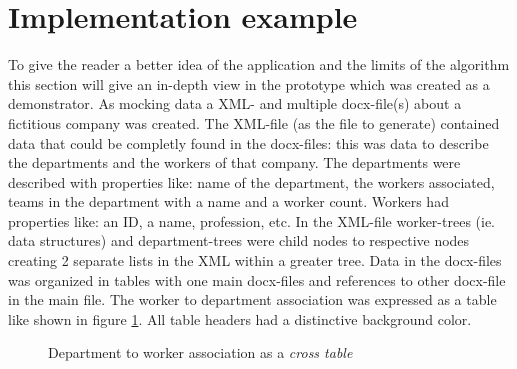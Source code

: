 \documentclass[conference]{IEEEtran}
\begin{document}
\section{Implementation example}
To give the reader a better idea of the application and the limits of the algorithm this section
will give an in-depth view in the prototype which was created as a demonstrator. As mocking
data a XML- and multiple docx-file(s) about a fictitious company was created. The XML-file (as
the file to generate) contained data that could be completly found in the docx-files: this was
data to describe the departments and the workers of that company. The departments were described
with properties like:\newline
name of the department, the workers associated, teams in the department with a name and a worker
count.\newline
Workers had properties like:
an ID, a name, profession, etc.\newline
In the XML-file worker-trees (ie. data structures) and department-trees were child nodes to
respective nodes creating 2 separate lists in the XML within a greater tree. Data in the
docx-files was organized in tables with one main docx-files and references to other
docx-file in the main file. The worker to  department association was expressed as a table
like shown in figure \ref{cross_table}. All table headers had a distinctive background color.
\begin{figure}[h]
 \centering
 \caption{Department to worker association as a \textit{cross table}}
 \label{cross_table}
\end{figure}
\end{document}
